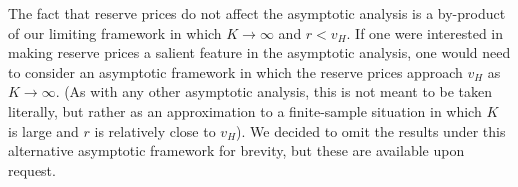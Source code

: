The fact that reserve prices do not affect the asymptotic analysis is a by-product of our limiting framework in which $K \to \infty$ and $r<v_H$. If one were interested in making reserve prices a salient feature in the asymptotic analysis, one would need to consider an asymptotic framework in which the reserve prices approach $v_H$ as $K\to \infty$. (As with any other asymptotic analysis, this is not meant to be taken literally, but rather as an approximation to a finite-sample situation in which $K$ is large and $r$ is relatively close to $v_H$). We decided to omit the results under this alternative asymptotic framework for brevity, but these are available upon request. 





